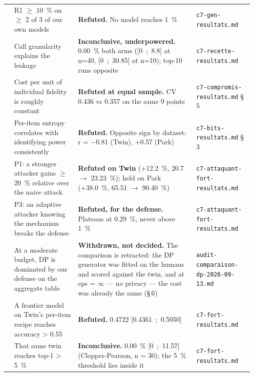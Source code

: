 \documentclass[sigconf,anonymous,review]{acmart}
\begin{document}
\begin{table}[t]
\begin{tabular}{@{}>{\raggedright\arraybackslash}p{}>{\raggedright\arraybackslash}p{}>{\raggedright\arraybackslash}p{}>{\raggedright\arraybackslash}p{}@{}}
    8 & R1 $\geq$ 10~\% on $\geq$ 2 of 3 of our own models & \textbf{Refuted.} No model reaches 1~\% & \texttt{c7-\allowbreak{}gen-\allowbreak{}resultats\allowbreak{}.md} \\
    9 & Call granularity explains the leakage & \textbf{Inconclusive, underpowered.} 0.00~\% both arms ([0~;~8.8] at n=40, [0~;~30.85] at n=10); top-10 runs opposite & \texttt{c7-\allowbreak{}recette-\allowbreak{}resultats\allowbreak{}.md} \\
    10 & Cost per unit of individual fidelity is roughly constant & \textbf{Refuted at equal sample.} CV 0.436 vs 0.357 on the same 9 points & \texttt{c7-\allowbreak{}compromis-\allowbreak{}resultats\allowbreak{}.md} \S\,5 \\
    11 & Per-item entropy correlates with identifying power consistently & \textbf{Refuted.} Opposite sign by dataset: r = $-0$.81 (Twin), +0.57 (Park) & \texttt{c7-\allowbreak{}bits-\allowbreak{}resultats\allowbreak{}.md} \S\,3 \\
    12 & P1: a stronger attacker gains $\geq$ 20~\% relative over the naive attack & \textbf{Refuted on Twin} (+12.2~\%, 20.7 $\rightarrow$ 23.23~\%); held on Park (+38.0~\%, 65.51 $\rightarrow$ 90.40~\%) & \texttt{c7-\allowbreak{}attaquant-\allowbreak{}fort-\allowbreak{}resultats\allowbreak{}.md} \\
    13 & P3: an adaptive attacker knowing the mechanism breaks the defense & \textbf{Refuted, for the defense.} Plateaus at 0.29~\%, never above 1~\% & \texttt{c7-\allowbreak{}attaquant-\allowbreak{}fort-\allowbreak{}resultats\allowbreak{}.md} \\
    14 & At a moderate budget, DP is dominated by our defense on the aggregate table & \textbf{Withdrawn, not decided.} The comparison is retracted: the DP generator was fitted on the humans and scored against the twin, and at eps = $\infty$ --- no privacy --- the cost was already the same (\S\,6) & \texttt{audit-\allowbreak{}comparaison-\allowbreak{}dp-\allowbreak{}2026-\allowbreak{}09-\allowbreak{}13\allowbreak{}.md} \\
    15 & A frontier model on Twin's per-item recipe reaches accuracy > 0.55 & \textbf{Refuted.} 0.4722 [0.4361~;~0.5050] & \texttt{c7-\allowbreak{}fort-\allowbreak{}resultats\allowbreak{}.md} \\
    16 & That same twin reaches top-1 > 5~\% & \textbf{Inconclusive.} 0.00~\% [0~;~11.57] (Clopper-Pearson, n = 30); the 5~\% threshold lies inside it & \texttt{c7-\allowbreak{}fort-\allowbreak{}resultats\allowbreak{}.md} \\

\end{tabular}
\end{table}
\end{document}
